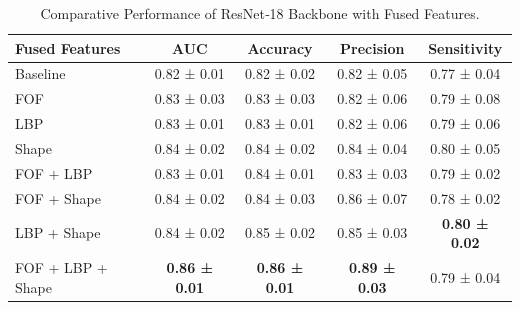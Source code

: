 \begin{table}[htb]
  \centering
  \caption{Comparative Performance of ResNet‑18 Backbone with Fused Features.}
  \label{tab:resnet18_fusion_metrics}
  \begin{tabular}{@{} l  c  c  c  c @{}}
    \toprule
    \textbf{Fused Features} 
      & \textbf{AUC} 
      & \textbf{Accuracy} 
      & \textbf{Precision} 
      & \textbf{Sensitivity} \\
    \midrule
    Baseline                & 0.82 ± 0.01 & 0.82 ± 0.02 & 0.82 ± 0.05 & 0.77 ± 0.04 \\
    \hline \addlinespace
    FOF                     & 0.83 ± 0.03 & 0.83 ± 0.03 & 0.82 ± 0.06 & 0.79 ± 0.08 \\
    LBP                     & 0.83 ± 0.01 & 0.83 ± 0.01 & 0.82 ± 0.06 & 0.79 ± 0.06 \\
    Shape                   & 0.84 ± 0.02 & 0.84 ± 0.02 & 0.84 ± 0.04 & 0.80 ± 0.05 \\
    \hline \addlinespace
    FOF + LBP               & 0.83 ± 0.01 & 0.84 ± 0.01 & 0.83 ± 0.03 & 0.79 ± 0.02 \\
    FOF + Shape             & 0.84 ± 0.02 & 0.84 ± 0.03 & 0.86 ± 0.07 & 0.78 ± 0.02 \\
    LBP + Shape             & 0.84 ± 0.02 & 0.85 ± 0.02	& 0.85 ± 0.03 & \textbf{0.80 ± 0.02} \\
    \hline \addlinespace
    FOF + LBP + Shape       & \textbf{0.86 ± 0.01} & \textbf{0.86 ± 0.01}	& \textbf{0.89 ± 0.03} & 0.79 ± 0.04 \\
    \bottomrule
  \end{tabular}
\end{table}


